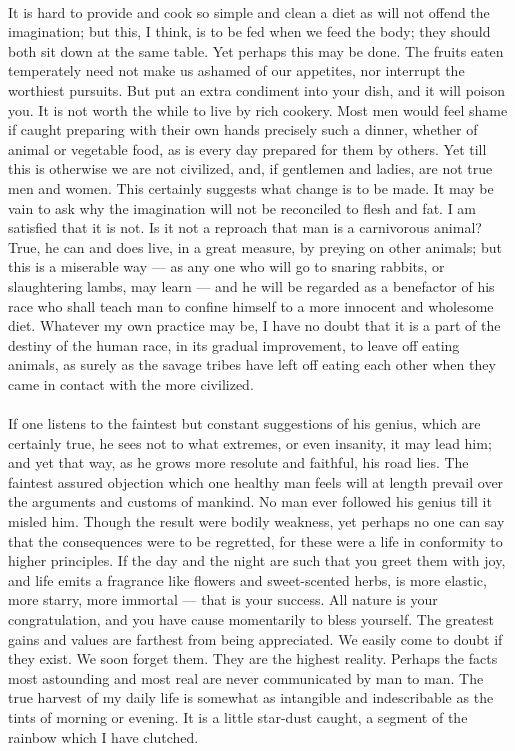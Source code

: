 \documentclass[letterpaper,12pt]{article}
\begin{document}
\paragraph{} It is hard to provide and cook so simple and clean a diet as will
not offend the imagination; but this, I think, is to be fed when we feed the
body; they should both sit down at the same table. Yet perhaps this may be done.
The fruits eaten temperately need not make us ashamed of our appetites, nor
interrupt the worthiest pursuits. But put an extra condiment into your dish, and
it will poison you. It is not worth the while to live by rich cookery. Most men
would feel shame if caught preparing with their own hands precisely such a
dinner, whether of animal or vegetable food, as is every day prepared for them
by others. Yet till this is otherwise we are not civilized, and, if gentlemen
and ladies, are not true men and women. This certainly suggests what change is
to be made. It may be vain to ask why the imagination will not be reconciled to
flesh and fat. I am satisfied that it is not. Is it not a reproach that man is a
carnivorous animal? True, he can and does live, in a great measure, by preying
on other animals; but this is a miserable way --- as any one who will go to
snaring rabbits, or slaughtering lambs, may learn --- and he will be regarded as
a benefactor of his race who shall teach man to confine himself to a more
innocent and wholesome diet. Whatever my own practice may be, I have no doubt
that it is a part of the destiny of the human race, in its gradual improvement,
to leave off eating animals, as surely as the savage tribes have left off eating
each other when they came in contact with the more civilized.

\paragraph{} If one listens to the faintest but constant suggestions of his
genius, which are certainly true, he sees not to what extremes, or even
insanity, it may lead him; and yet that way, as he grows more resolute and
faithful, his road lies. The faintest assured objection which one healthy man
feels will at length prevail over the arguments and customs of mankind. No man
ever followed his genius till it misled him. Though the result were bodily
weakness, yet perhaps no one can say that the consequences were to be regretted,
for these were a life in conformity to higher principles. If the day and the
night are such that you greet them with joy, and life emits a fragrance like
flowers and sweet-scented herbs, is more elastic, more starry, more immortal ---
that is your success. All nature is your congratulation, and you have cause
momentarily to bless yourself. The greatest gains and values are farthest from
being appreciated. We easily come to doubt if they exist. We soon forget them.
They are the highest reality. Perhaps the facts most astounding and most real
are never communicated by man to man. The true harvest of my daily life is
somewhat as intangible and indescribable as the tints of morning or evening. It
is a little star-dust caught, a segment of the rainbow which I have clutched.
\end{document}
